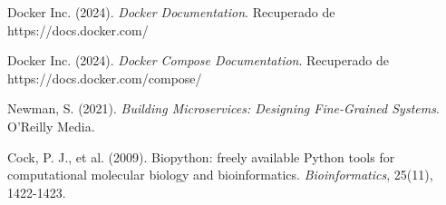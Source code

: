 \documentclass[12pt,a4paper]{article}
\begin{document}
\begin{thebibliography}{9}
Docker Inc. (2024). \textit{Docker Documentation}. Recuperado de https://docs.docker.com/

Docker Inc. (2024). \textit{Docker Compose Documentation}. Recuperado de https://docs.docker.com/compose/

Newman, S. (2021). \textit{Building Microservices: Designing Fine-Grained Systems}. O'Reilly Media.

Cock, P. J., et al. (2009). Biopython: freely available Python tools for computational molecular biology and bioinformatics. \textit{Bioinformatics}, 25(11), 1422-1423.
\end{thebibliography}
\end{document}
